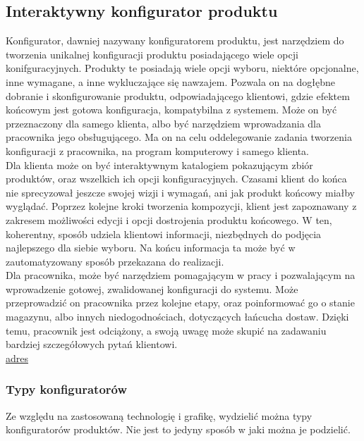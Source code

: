 \documentclass{article} %
\begin{document}
        
        
    \subsection{Interaktywny konfigurator produktu}
        Konfigurator, dawniej nazywany konfiguratorem produktu, jest narzędziem do tworzenia unikalnej konfiguracji produktu posiadającego wiele opcji konifguracyjnych. Produkty te posiadają wiele opcji wyboru, niektóre opcjonalne, inne wymagane, a inne wykluczające się nawzajem. Pozwala on na dogłębne dobranie i skonfigurowanie produktu, odpowiadającego klientowi, gdzie efektem końcowym jest gotowa konfiguracja, kompatybilna z systemem. Może on być przeznaczony dla samego klienta, albo być narzędziem wprowadzania dla pracownika jego obsługującego. Ma on na celu oddelegowanie zadania tworzenia konfiguracji z pracownika, na program komputerowy i samego klienta.
        \\
        
        Dla klienta może on być interaktywnym katalogiem pokazującym zbiór produktów, oraz wszelkich ich opcji konfiguracyjnych. Czasami klient do końca nie sprecyzował jeszcze swojej wizji i wymagań, ani jak produkt końcowy miałby wyglądać. Poprzez kolejne kroki tworzenia kompozycji, klient jest zapoznawany z zakresem możliwości edycji i opcji dostrojenia produktu końcowego. W ten, koherentny, sposób udziela klientowi informacji, niezbędnych do podjęcia najlepszego dla siebie wyboru. Na końcu informacja ta może być w zautomatyzowany sposób przekazana do realizacji.
        \\
        
        Dla pracownika, może być narzędziem pomagającym w pracy i pozwalającym na wprowadzenie gotowej, zwalidowanej konfiguracji do systemu. Może przeprowadzić on pracownika przez kolejne etapy, oraz poinformować go o stanie magazynu, albo innych niedogodnościach, dotyczących łańcucha dostaw. Dzięki temu, pracownik jest odciążony, a swoją uwagę może skupić na zadawaniu bardziej szczegółowych pytań klientowi.
        \\
        \href{https://docs.oracle.com/cd/E16582_01/doc.91/e15086/und_configurator.htm#EOABC00002}{adres}
        \\
        
        \subsubsection{Typy konfiguratorów}
        Ze względu na zastosowaną technologię i grafikę, wydzielić można typy konfiguratorów produktów. Nie jest to jedyny sposób w jaki można je podzielić.
        \\
        
\end{document}
